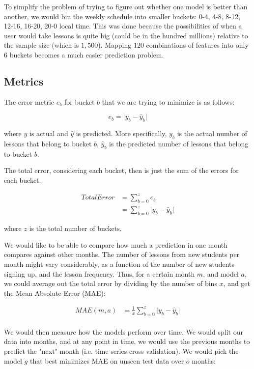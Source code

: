 \documentclass[oneside]{article}
\begin{document}
To simplify the problem of trying to figure out whether one model is better
than another, we would bin the weekly schedule into smaller buckets: 0-4, 4-8,
8-12, 12-16, 16-20, 20-0 local time. This was done because the possibilities of
when a user would take lessons is quite big (could be in the hundred millions)
relative to the sample size (which is $1,500$). Mapping $120$ combinations of
features into only $6$ buckets becomes a much easier prediction problem.

\subsection{Metrics}

The error metric $e_b$ for bucket $b$ that we are trying to minimize is as follows:

\begin{equation}
  e_b = \lvert y_{b} - \hat{y}_{b} \rvert
\end{equation}

where $y$ is actual and $\hat{y}$ is predicted.  More specifically, $y_{b}$
is the actual number of lessons that belong to bucket $b$, $\hat{y}_{b}$ is
the predicted number of lessons that belong to bucket $b$.

The total error, considering each bucket, then is just the sum of the errors
for each bucket.

\begin{align}
  Total Error &= \sum_{b=0}^{z}{e_b} \\
              &= \sum_{b=0}^{z}{\lvert y_{b} - \hat{y}_{b} \rvert}
\end{align}

where $z$ is the total number of buckets.

We would like to be able to compare how much a prediction in one month compares
against other months. The number of lessons from new students per month might
vary considerably, as a function of the number of new students signing up, and
the lesson frequency. Thus, for a certain month $m$, and model $a$, we could
average out the total error by dividing by the number of bins $x$, and get
the Mean Absolute Error (MAE):

\begin{align}
  MAE(m,a) &= \frac{1}{x}\sum_{b=0}^{z}{\lvert y_{b} - \hat{y}_{b} \rvert}\\
\end{align}

We would then measure how the models perform over time. We would split our data
into months, and at any point in time, we would use the previous months to
predict the "next" month (i.e. time series cross validation)\cite{tscv}. We would pick the
model $g$ that best minimizes MAE on unseen test data over $o$ months:
\end{document}
